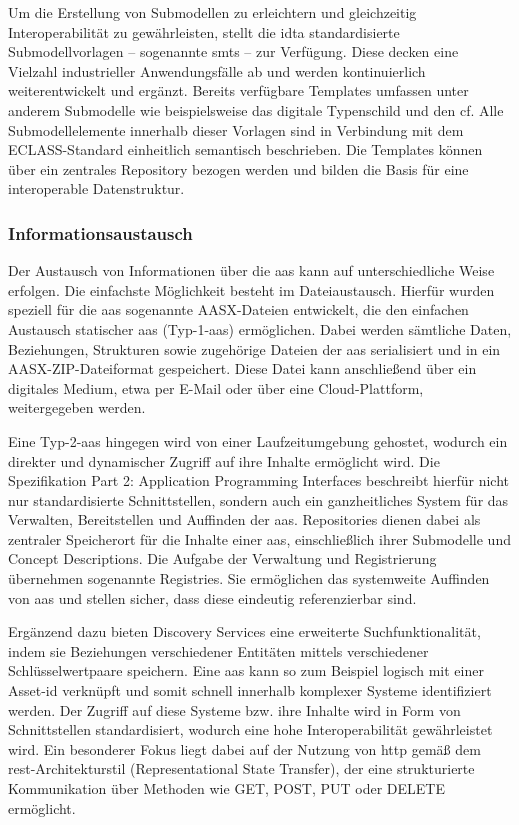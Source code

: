 Um die Erstellung von Submodellen zu erleichtern und gleichzeitig Interoperabilität zu gewährleisten, stellt die \acs{idta} standardisierte Submodellvorlagen -- sogenannte \acp{smt} -- zur Verfügung.
Diese decken eine Vielzahl industrieller Anwendungsfälle ab und werden kontinuierlich weiterentwickelt und ergänzt.
Bereits verfügbare Templates umfassen unter anderem Submodelle wie beispielsweise das digitale \linebreak
Typenschild und den \ac{cf}.
Alle Submodellelemente innerhalb dieser Vorlagen sind in Verbindung mit dem ECLASS-Standard einheitlich semantisch beschrieben.
Die Templates können über ein zentrales Repository \cite{idtaTemplates} bezogen werden und bilden die Basis für eine interoperable Datenstruktur.

\subsubsection{Informationsaustausch}
Der Austausch von Informationen über die \acs{aas} kann auf unterschiedliche Weise erfolgen.
Die einfachste Möglichkeit besteht im Dateiaustausch. Hierfür wurden speziell für die \acs{aas} sogenannte AASX-Dateien \cite{SpezifikationPart5} entwickelt, die den einfachen Austausch statischer \acs{aas} (Typ-1-\acs{aas}) ermöglichen.
Dabei werden sämtliche Daten, Beziehungen, Strukturen sowie zugehörige Dateien der \acs{aas} serialisiert und in ein AASX-ZIP-Dateiformat gespeichert. 
Diese Datei kann anschließend über ein digitales Medium, etwa per E-Mail oder über eine Cloud-Plattform, weitergegeben werden. 

Eine Typ-2-\acs{aas} hingegen wird von einer Laufzeitumgebung gehostet, wodurch ein direkter und dynamischer Zugriff auf ihre Inhalte ermöglicht wird. 
Die Spezifikation Part 2: Application Programming Interfaces \cite{SpezifikationPart2} beschreibt hierfür nicht nur standardisierte Schnittstellen, sondern auch ein ganzheitliches System für das Verwalten, Bereitstellen und Auffinden der \acs{aas}.
Repositories dienen dabei als zentraler Speicherort für die Inhalte einer \acs{aas}, einschließlich ihrer Submodelle und Concept Descriptions.
Die Aufgabe der Verwaltung und Registrierung übernehmen sogenannte Registries.
Sie ermöglichen das systemweite Auffinden von \acs{aas} und stellen sicher, dass diese eindeutig referenzierbar sind.

Ergänzend dazu bieten Discovery Services eine erweiterte Suchfunktionalität, indem sie Beziehungen verschiedener Entitäten mittels verschiedener Schlüsselwertpaare speichern.
Eine \acs{aas} kann so zum Beispiel logisch mit einer Asset-\acs{id} verknüpft und somit schnell innerhalb komplexer Systeme identifiziert werden.
Der Zugriff auf diese Systeme bzw. ihre Inhalte wird in Form von Schnittstellen standardisiert, wodurch eine hohe Interoperabilität gewährleistet wird.
Ein besonderer Fokus liegt dabei auf der Nutzung von \ac{http} gemäß dem \acs{rest}-Architekturstil (Representational State Transfer), der eine strukturierte Kommunikation über Methoden wie GET, POST, PUT oder DELETE ermöglicht.

